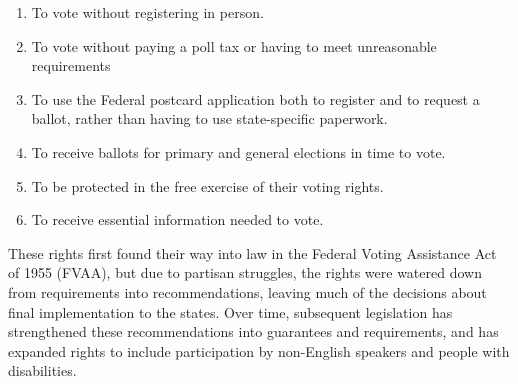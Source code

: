 \begin{enumerate}
  \item To vote without registering in person.
  \item To vote without paying a poll tax or having to meet
    unreasonable requirements
  \item To use the Federal postcard application both to register and
    to request a ballot, rather than having to use state-specific
    paperwork.
  \item To receive ballots for primary and general elections in time to vote.
  \item To be protected in the free exercise of their voting rights.
  \item To receive essential information needed to vote.
\end{enumerate}

These rights first found their way into law in the Federal Voting
Assistance Act of 1955 (FVAA), but due to partisan struggles, the
rights were watered down from requirements into recommendations,
leaving much of the decisions about final implementation to the
states. Over time, subsequent legislation has strengthened these
recommendations into guarantees and requirements, and has expanded
rights to include participation by non-English speakers and people
with disabilities.






